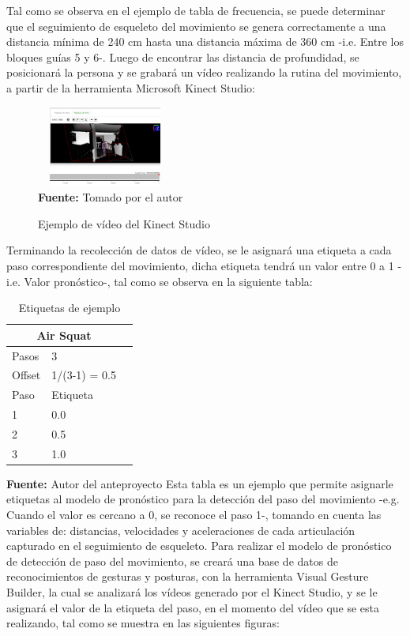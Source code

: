 \documentclass[twoside,twocolumn]{article}
\begin{document}
\medbreak 
Tal como se observa en el ejemplo de tabla de frecuencia, se puede determinar que el seguimiento de esqueleto del movimiento se genera correctamente a una distancia mínima de 240 cm hasta una distancia máxima de 360 cm -i.e. Entre los bloques guías 5 y 6-.
\medbreak 
Luego de encontrar las distancia de profundidad, se posicionará la persona y se grabará un vídeo realizando la rutina del movimiento, a partir de la herramienta Microsoft Kinect Studio:
\begin{figure}[H]
	\caption{Ejemplo de vídeo del Kinect Studio}
	\label{fig:KinectStudio}
	\centering
	\includegraphics[width=170px,height=100px]{img/kinectStudio.PNG} \\
	\textbf{Fuente:} Tomado por el autor
\end{figure}
\medbreak 
Terminando la recolección de datos de vídeo, se le asignará una etiqueta a cada paso correspondiente del movimiento, dicha etiqueta tendrá un valor entre 0 a 1 -i.e. Valor pronóstico-, tal como se observa en la siguiente tabla:
\begin{table}[H]
\caption{Etiquetas de ejemplo}
\centering
\begin{tabular}{llr}
\toprule
\multicolumn{2}{c}{Air Squat} \\
\midrule
Pasos & 3  \\
\midrule
Offset & 1/(3-1) = 0.5   \\
\midrule
Paso & Etiqueta \\
\midrule
1 & 0.0    \\
2 & 0.5    \\
3 & 1.0    \\
\bottomrule
\end{tabular}
\end{table}
\textbf{Fuente:} Autor del anteproyecto
\medbreak 
Esta tabla es un ejemplo que permite asignarle etiquetas al modelo de pronóstico para la detección del paso del movimiento -e.g. Cuando el valor es cercano a 0, se reconoce el paso 1-, tomando en cuenta las variables de: distancias, velocidades y  aceleraciones de cada articulación capturado en el seguimiento de esqueleto.
\medbreak 
Para realizar el modelo de pronóstico de detección de paso del movimiento, se creará una base de datos de reconocimientos de gesturas y posturas, con la herramienta Visual Gesture Builder, la cual se analizará los vídeos generado por el Kinect Studio, y se le asignará el valor de la etiqueta del paso, en el momento del vídeo que se esta realizando, tal como se muestra en las siguientes figuras:
\end{document}
